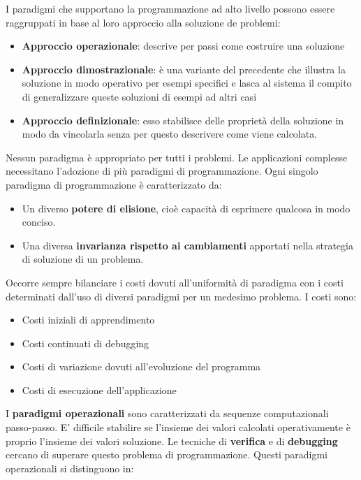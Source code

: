 \documentclass[a4paper,18pt]{extarticle}
\begin{document}
I paradigmi che supportano la programmazione ad alto livello possono essere raggruppati in base al loro approccio alla soluzione de problemi:
\begin{itemize}
  \item \textbf{Approccio operazionale}: descrive per passi come costruire una soluzione
  \item \textbf{Approccio dimostrazionale}: è una variante del precedente che illustra la soluzione in modo operativo per esempi specifici e lasca al sistema il compito di generalizzare queste soluzioni di esempi ad altri casi
  \item\textbf{Approccio definizionale}: esso stabilisce delle proprietà della soluzione in modo da vincolarla senza per questo descrivere come viene calcolata.
\end{itemize}

Nessun paradigma è appropriato per tutti i problemi. Le applicazioni complesse necessitano l'adozione di più paradigmi di programmazione. Ogni singolo paradigma di programmazione è caratterizzato da:
\begin{itemize}
  \item Un diverso \textbf{potere di elisione}, cioè capacità di esprimere qualcosa in modo conciso. 
  \item Una diversa \textbf{invarianza rispetto ai cambiamenti} apportati nella strategia di soluzione di un problema. 
\end{itemize}

Occorre sempre bilanciare i costi dovuti all'uniformità di paradigma con i costi determinati dall'uso di diversi paradigmi per un medesimo problema. I costi sono:
\begin{itemize}
  \item Costi iniziali di apprendimento
  \item Costi continuati di debugging
  \item Costi di variazione dovuti all'evoluzione del programma
  \item Costi di esecuzione dell'applicazione
\end{itemize}

I \textbf{paradigmi operazionali} sono caratterizzati da sequenze computazionali passo-passo. E' difficile stabilire se l'insieme dei valori calcolati operativamente è proprio l'insieme dei valori soluzione. Le tecniche di \textbf{verifica} e di \textbf{debugging} cercano di superare questo problema di programmazione. Questi paradigmi operazionali si distinguono in:
\end{document}
